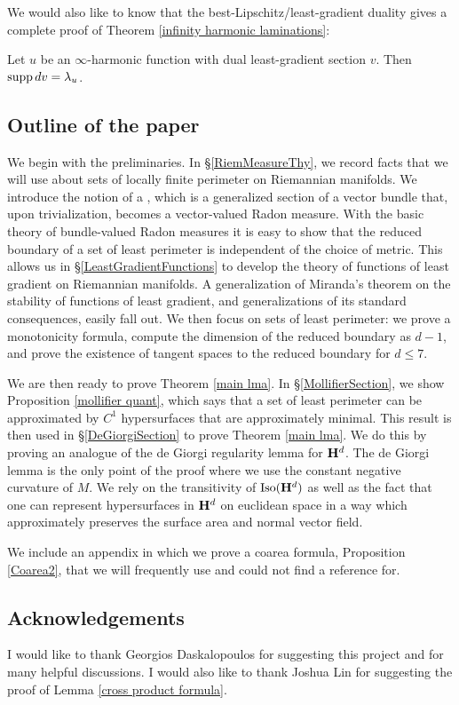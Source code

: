 We would also like to know that the best-Lipschitz/least-gradient duality gives a complete proof of Theorem \ref{infinity harmonic laminations}:

\begin{conjecture}
Let $u$ be an $\infty$-harmonic function with dual least-gradient section $v$.
Then $\operatorname{supp} dv = \lambda_u$.
\end{conjecture}


\subsection{Outline of the paper}
We begin with the preliminaries.
In \S\ref{RiemMeasureThy}, we record facts that we will use about sets of locally finite perimeter on Riemannian manifolds.
We introduce the notion of a , which is a generalized section of a vector bundle that, upon trivialization, becomes a vector-valued Radon measure.
With the basic theory of bundle-valued Radon measures it is easy to show that the reduced boundary of a set of least perimeter is independent of the choice of metric.
This allows us in \S\ref{LeastGradientFunctions} to develop the theory of functions of least gradient on Riemannian manifolds. A generalization of Miranda's theorem \cite[Teorema 3]{Miranda67} on the stability of functions of least gradient, and generalizations of its standard consequences, easily fall out.
We then focus on sets of least perimeter: we prove a monotonicity formula, compute the dimension of the reduced boundary as $d - 1$, and prove the existence of tangent spaces to the reduced boundary for $d \leq 7$.

We are then ready to prove Theorem \ref{main lma}.
In \S\ref{MollifierSection}, we show Proposition \ref{mollifier quant}, which says that a set of least perimeter can be approximated by $C^1$ hypersurfaces that are approximately minimal.
This result is then used in \S\ref{DeGiorgiSection} to prove Theorem \ref{main lma}. We do this by proving an analogue of the de Giorgi regularity lemma \cite[Teorema 5.7]{Miranda66} for $\mathbf H^d$. The de Giorgi lemma is the only point of the proof where we use the constant negative curvature of $M$.
We rely on the transitivity of $\operatorname{Iso}(\mathbf H^d)$ as well as the fact that one can represent hypersurfaces in $\mathbf H^d$ on euclidean space in a way which approximately preserves the surface area and normal vector field.

We include an appendix in which we prove a coarea formula, Proposition \ref{Coarea2}, that we will frequently use and could not find a reference for.


\subsection{Acknowledgements}
I would like to thank Georgios Daskalopoulos for suggesting this project and for many helpful discussions.
I would also like to thank Joshua Lin for suggesting the proof of Lemma \ref{cross product formula}.
